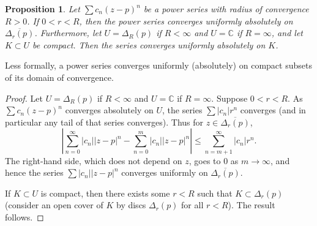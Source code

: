 \documentclass[12pt,openany]{book}
\newcommand{\sabs}[1]{\lvert {#1} \rvert}
\newcommand{\abs}[1]{\left\lvert {#1} \right\rvert}
\newcommand{\C}{{\mathbb{C}}}
\theoremstyle{plain}
\newtheorem{prop}[thm]{Proposition}
\theoremstyle{remark}
\theoremstyle{definition}
\theoremstyle{exercise}
\theoremstyle{example}
\begin{document}
\begin{prop}
Let $\sum c_n {(z-p)}^n$ be a power series with radius of convergence $R
> 0$.  If $0 < r < R$, then the power series converges uniformly absolutely
on $\overline{\Delta_r(p)}$. Furthermore, let $U = \Delta_R(p)$ if $R < \infty$ and
$U = \C$ if $R=\infty$, and let $K \subset U$ be compact.
Then the series converges uniformly absolutely on $K$.
\end{prop}

Less formally, a power series converges uniformly (absolutely) on
compact subsets of its domain of convergence.

\begin{proof}
Let $U = \Delta_R(p)$ if $R < \infty$ and $U=\C$ if $R=\infty$.
Suppose $0 < r < R$.  As $\sum c_n {(z-p)}^n$ converges absolutely
on $U$, the series
$\sum \sabs{c_n} r^n$ converges (and in particular any tail of
that series converges).  Thus for $z \in \overline{\Delta_r(p)}$,
\begin{equation*}
\abs{
\sum_{n=0}^\infty \sabs{c_n} \sabs{z-p}^n
-
\sum_{n=0}^{m} \sabs{c_n} \sabs{z-p}^n
}
\leq
\sum_{n=m+1}^\infty \sabs{c_n} r^n .
\end{equation*}
The right-hand side, which does not depend on $z$,
goes to $0$ as $m \to \infty$, and hence 
the series $\sum \sabs{c_n} \sabs{z-p}^n$ converges uniformly
on $\overline{\Delta_r(p)}$.

If $K \subset U$ is compact, then there exists some $r <
R$ such that $K \subset \Delta_r(p)$ (consider an open cover of
$K$ by discs $\Delta_r(p)$ for all $r < R$).  The result follows.
\end{proof}
\end{document}

